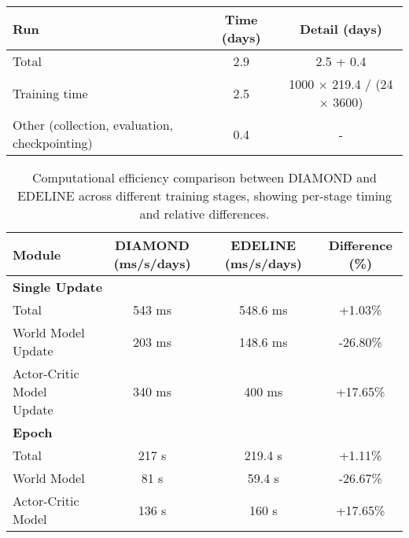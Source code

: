 \begin{table}[hbt!]
\begin{tabular}{@{}lcc@{}}
\textbf{Run}                                  & \textbf{Time (days)} & \textbf{Detail (days)}    \\ \midrule
Total                                         & 2.9                & 2.5 + 0.4                  \\
\quad Training time                           & 2.5                & 1000 $\times$ 219.4 / (24 $\times$ 3600) \\
\quad Other (collection, evaluation, checkpointing) & 0.4          & -                          \\ \bottomrule
\end{tabular}
\end{table}

\begin{table}[h]
\centering
\caption{Computational efficiency comparison between DIAMOND and EDELINE across different training stages, showing per-stage timing and relative differences.}
\label{tab:comparison}
\begin{tabular}{@{}lccc@{}}
\toprule
\textbf{Module}                & \textbf{DIAMOND (ms/s/days)} & \textbf{EDELINE (ms/s/days)} & \textbf{Difference (\%)} \\ \midrule
\multicolumn{4}{l}{\textbf{Single Update}}                                                                          \\ \midrule
Total                          & 543 ms                     & 548.6 ms                       & +1.03\%                 \\
\quad World Model Update       & 203 ms                      & 148.6 ms                       & -26.80\%                \\
\quad Actor-Critic Model Update & 340 ms                     & 400 ms                         & +17.65\%                \\ \midrule
\multicolumn{4}{l}{\textbf{Epoch}}                                                                                   \\ \midrule
Total                          & 217 s                      & 219.4 s                        & +1.11\%                 \\
\quad World Model              & 81 s                       & 59.4 s                         & -26.67\%                \\
\quad Actor-Critic Model       & 136 s                      & 160 s                          & +17.65\%                \\ \bottomrule
\end{tabular}
\end{table}
